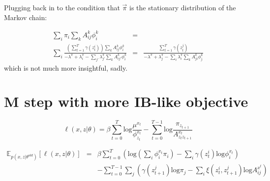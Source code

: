 \documentclass[11pt]{article}
\begin{document}
Plugging back in to the condition that $\vec{\pi}$ is the stationary distribution of the Markov chain:

\begin{eqnarray*}
\sum_i\pi_i\sum_k A^k_{ij}\phi^k_i & = & \\
\sum_i  \frac{(\sum_{t=1}^T \gamma(z_t^i))\sum_k A^k_{ij}\phi^k_i}{-\lambda^\pi + \lambda^\pi_i - \sum_{j'}\lambda^\pi_{j'} \sum_k A^k_{ij'}\phi^k_i} & = & \frac{\sum_{t=1}^T \gamma(z_t^j)}{-\lambda^\pi + \lambda^\pi_j - \sum_i\lambda^\pi_i \sum_k A^k_{ji}\phi^k_j}
\end{eqnarray*}
which is not much more insightful, sadly.

\section{M step with more IB-like objective}

\[
\ell(x,z|\theta) = \beta \sum_{t=0}^T \mathrm{log}\frac{\mu^{x_t}}{\phi^{x_t}_{z_t}} - \sum_{t=0}^{T-1} \mathrm{log}\frac{\pi_{z_{t+1}}}{A^{x_t}_{z_t z_{t+1}}}
\]

\begin{eqnarray*}
\mathbb{E}_{p(x,z|\theta^{old})}[\ell(x,z|\theta)] & = & \beta\sum_{t=0}^T \left(\mathrm{log}(\sum_i \phi_i^{x_t}\pi_i) - \sum_i \gamma(z_t^i) \mathrm{log}\phi_{i}^{x_t}\right) \\
& & - \sum_{t=0}^{T-1}\sum_j \left(\gamma(z_{t+1}^j)\mathrm{log}\pi_j - \sum_i \xi(z_{t}^i,z_{t+1}^j)\mathrm{log}A^{x^t}_{ij}\right)
\end{eqnarray*}
\end{document}
